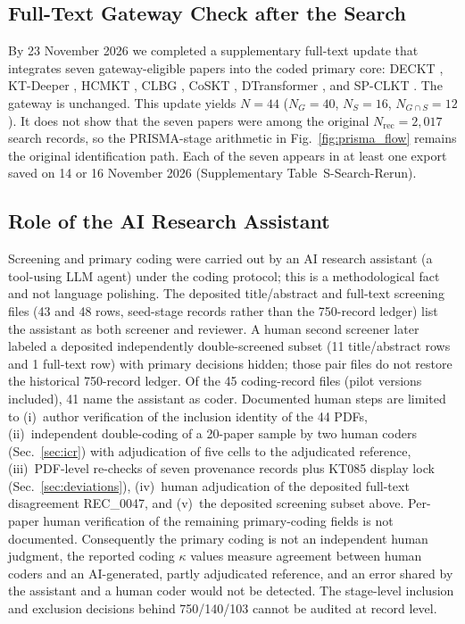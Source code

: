 \documentclass[lettersize,journal]{IEEEtran}
\begin{document}
\subsection{Full-Text Gateway Check after the Search}
\label{sec:gateway_ext}
By 23 November 2026 we completed a supplementary full-text update that integrates seven gateway-eligible papers into the coded primary core: DECKT \cite{DECKT_2025}, KT-Deeper \cite{Han_KTDeeper_2024}, HCMKT \cite{HCMKT_2026}, CLBG \cite{CLBG_2025}, CoSKT \cite{CoSKT_2024}, DTransformer \cite{DTransformer_2023}, and SP-CLKT \cite{SPCLKT_2024}. The gateway is unchanged. This update yields $N=44$ ($N_G=40$, $N_S=16$, $N_{G\cap S}=12$). It does not show that the seven papers were among the original $N_{\mathrm{rec}}=2{,}017$ search records, so the PRISMA-stage arithmetic in Fig.~\ref{fig:prisma_flow} remains the original identification path. Each of the seven appears in at least one export saved on 14 or 16 November 2026 (Supplementary Table~S-Search-Rerun).

\subsection{Role of the AI Research Assistant}
\label{sec:ai_role}
Screening and primary coding were carried out by an AI research assistant (a tool-using LLM agent) under the coding protocol; this is a methodological fact and not language polishing. The deposited title/abstract and full-text screening files (43 and 48 rows, seed-stage records rather than the 750-record ledger) list the assistant as both screener and reviewer. A human second screener later labeled a deposited independently double-screened subset (11 title/abstract rows and 1 full-text row) with primary decisions hidden; those pair files do not restore the historical 750-record ledger. Of the 45 coding-record files (pilot versions included), 41 name the assistant as coder. Documented human steps are limited to (i)~author verification of the inclusion identity of the 44 PDFs, (ii)~independent double-coding of a 20-paper sample by two human coders (Sec.~\ref{sec:icr}) with adjudication of five cells to the adjudicated reference, (iii)~PDF-level re-checks of seven provenance records plus KT085 display lock (Sec.~\ref{sec:deviations}), (iv)~human adjudication of the deposited full-text disagreement REC\_0047, and (v)~the deposited screening subset above. Per-paper human verification of the remaining primary-coding fields is not documented. Consequently the primary coding is not an independent human judgment, the reported coding $\kappa$ values measure agreement between human coders and an AI-generated, partly adjudicated reference, and an error shared by the assistant and a human coder would not be detected. The stage-level inclusion and exclusion decisions behind 750/140/103 cannot be audited at record level.
\end{document}
